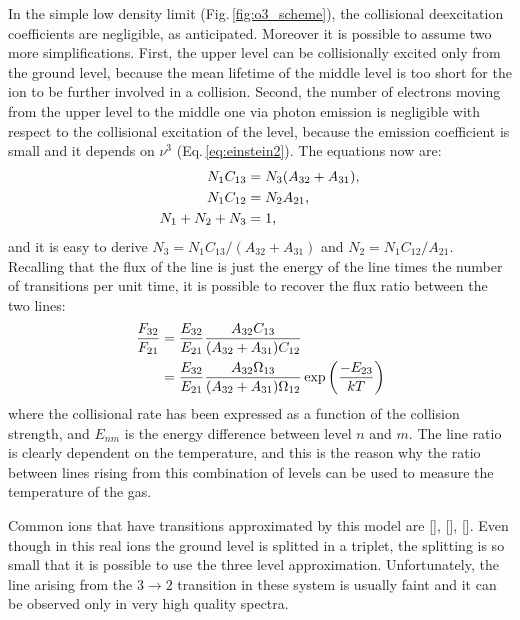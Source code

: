 \documentclass[../main.tex]{subfiles}
\begin{document}
In the simple low density limit (Fig.\,\ref{fig:o3_scheme}), the collisional deexcitation coefficients are negligible, as anticipated.
Moreover it is possible to assume two more simplifications.
First, the upper level can be collisionally excited only from the ground level, because the mean lifetime of the middle level is too short for the ion to be further involved in a collision.
Second, the number of electrons moving from the upper level to the middle one via photon emission is negligible with respect to the collisional excitation of the level, because the emission coefficient is small and it depends on $\nu^3$ (Eq.\,\ref{eq:einstein2}).
The equations now are:
\begin{align}
    \label{eq:lowdensity_equilibrium}
    N_1 C_{13} &= N_3(A_{32}+A_{31}), \notag\\
    N_1 C_{12} &= N_2A_{21},\\
    N_1+N_2+N_3 &= 1, \notag
\end{align}
and it is easy to derive $N_3 = N_1C_{13}/(A_{32}+A_{31})$ and $N_2= N_1C_{12}/A_{21}$.
Recalling that the flux of the line is just the energy of the line times the number of transitions per unit time, it is possible to recover the flux ratio between the two lines:
\begin{align}
    \label{eq:flux_forbidden1}
    \frac{F_{32}}{F_{21}} &= \frac{E_{32}}{E_{21}}\frac{A_{32}C_{13}}{(A_{32}+A_{31})C_{12}}\\
    & = \frac{E_{32}}{E_{21}}\frac{A_{32}\Omega_{13}}{(A_{32}+A_{31})\Omega_{12}}\exp \left(\frac{-E_{23}}{kT}\right) \notag
\end{align}
where the collisional rate has been expressed as a function of the collision strength, and $E_{nm}$ is the energy difference between level $n$ and $m$.
The line ratio is clearly dependent on the temperature, and this is the reason why the ratio between lines rising from this combination of levels can be used to measure the temperature of the gas.

Common ions that have transitions approximated by this model are [], [], [].
Even though in this real ions the ground level is splitted in a triplet, the splitting is so small that it is possible to use the three level approximation.
Unfortunately, the line arising from the $3\to2$ transition in these system is usually faint and it can be observed only in very high quality spectra.
\end{document}
